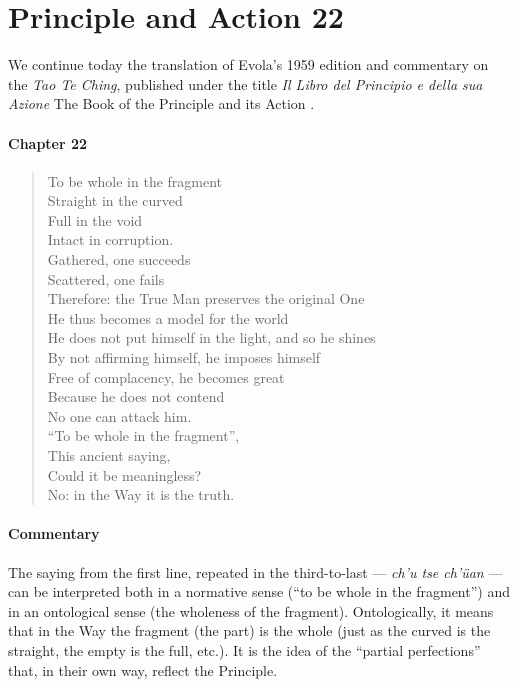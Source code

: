 \section{Principle and Action 22}

\begin{quotex}
We continue today the translation of Evola's 1959 edition and commentary on the \emph{Tao Te Ching}, published under the title \emph{Il Libro del Principio e della sua Azione} The Book of the Principle and its Action .
\end{quotex}

\paragraph{Chapter 22}

\begin{verse}
To be whole in the fragment\\ Straight in the curved\\ Full in the void\\ Intact in corruption.\\ Gathered, one succeeds\\ Scattered, one fails\\ Therefore: the True Man preserves the original One\\ He thus becomes a model for the world\\ He does not put himself in the light, and so he shines\\ By not affirming himself, he imposes himself\\ Free of complacency, he becomes great\\ Because he does not contend\\ No one can attack him.\\ ``To be whole in the fragment'',\\ This ancient saying,\\ Could it be meaningless?\\ No: in the Way it is the truth.
\end{verse}

\paragraph{Commentary}


The saying from the first line, repeated in the third-to-last --- \emph{ch'u tse ch'üan} --- can be interpreted both in a normative sense (``to be whole in the fragment'') and in an ontological sense (the wholeness of the fragment). Ontologically, it means that in the Way the fragment (the part) is the whole (just as the curved is the straight, the empty is the full, etc.). It is the idea of the ``partial perfections'' that, in their own way, reflect the Principle.


